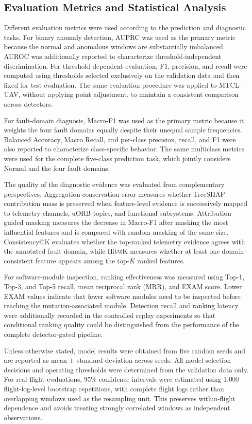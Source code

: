 \subsection{Evaluation Metrics and Statistical Analysis}
\label{sec:evaluation_metrics}

Different evaluation metrics were used according to the prediction and diagnostic tasks. For binary anomaly detection, AUPRC was used as the primary metric because the normal and anomalous windows are substantially imbalanced. AUROC was additionally reported to characterize threshold-independent discrimination. For threshold-dependent evaluation, F1, precision, and recall were computed using thresholds selected exclusively on the validation data and then fixed for test evaluation. The same evaluation procedure was applied to MTCL-UAV, without applying point adjustment, to maintain a consistent comparison across detectors.

For fault-domain diagnosis, Macro-F1 was used as the primary metric because it weights the four fault domains equally despite their unequal sample frequencies. Balanced Accuracy, Macro Recall, and per-class precision, recall, and F1 were also reported to characterize class-specific behavior. The same multiclass metrics were used for the complete five-class prediction task, which jointly considers Normal and the four fault domains.

The quality of the diagnostic evidence was evaluated from complementary perspectives. Aggregation conservation error measures whether TreeSHAP contribution mass is preserved when feature-level evidence is successively mapped to telemetry channels, uORB topics, and functional subsystems. Attribution-guided masking measures the decrease in Macro-F1 after masking the most influential features and is compared with random masking of the same size. Consistency@K evaluates whether the top-ranked telemetry evidence agrees with the annotated fault domain, while Hit@K measures whether at least one domain-consistent feature appears among the top-$K$ ranked features.

For software-module inspection, ranking effectiveness was measured using Top-1, Top-3, and Top-5 recall, mean reciprocal rank (MRR), and EXAM score. Lower EXAM values indicate that fewer software modules need to be inspected before reaching the mutation-associated module. Detection recall and ranking latency were additionally recorded in the controlled replay experiments so that conditional ranking quality could be distinguished from the performance of the complete detector-gated pipeline.

Unless otherwise stated, model results were obtained from five random seeds and are reported as mean $\pm$ standard deviation across seeds. All model-selection decisions and operating thresholds were determined from the validation data only. For real-flight evaluations, 95\% confidence intervals were estimated using 1,000 flight-log-level bootstrap repetitions, with complete flight logs rather than overlapping windows used as the resampling unit. This preserves within-flight dependence and avoids treating strongly correlated windows as independent observations.

